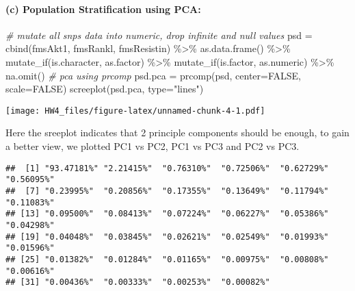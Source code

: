\documentclass[
]{article}
\newenvironment{Shaded}{\begin{snugshade}}{\end{snugshade}}
\newcommand{\AttributeTok}[1]{\textcolor[rgb]{0.77,0.63,0.00}{#1}}
\newcommand{\CommentTok}[1]{\textcolor[rgb]{0.56,0.35,0.01}{\textit{#1}}}
\newcommand{\ConstantTok}[1]{\textcolor[rgb]{0.00,0.00,0.00}{#1}}
\newcommand{\DecValTok}[1]{\textcolor[rgb]{0.00,0.00,0.81}{#1}}
\newcommand{\FunctionTok}[1]{\textcolor[rgb]{0.00,0.00,0.00}{#1}}
\newcommand{\NormalTok}[1]{#1}
\newcommand{\OtherTok}[1]{\textcolor[rgb]{0.56,0.35,0.01}{#1}}
\newcommand{\SpecialCharTok}[1]{\textcolor[rgb]{0.00,0.00,0.00}{#1}}
\newcommand{\StringTok}[1]{\textcolor[rgb]{0.31,0.60,0.02}{#1}}
\begin{document}
\hypertarget{c-population-stratification-using-pca}{%
\paragraph{(c) Population Stratification using
PCA:}\label{c-population-stratification-using-pca}}

\begin{Shaded}
\begin{Highlighting}[]
\CommentTok{\# mutate all snps data into numeric, drop infinite and null values}
\NormalTok{psd }\OtherTok{=} \FunctionTok{cbind}\NormalTok{(fmsAkt1, fmsRankl, fmsResistin) }\SpecialCharTok{\%\textgreater{}\%} 
  \FunctionTok{as.data.frame}\NormalTok{() }\SpecialCharTok{\%\textgreater{}\%} 
  \FunctionTok{mutate\_if}\NormalTok{(is.character, as.factor) }\SpecialCharTok{\%\textgreater{}\%} 
  \FunctionTok{mutate\_if}\NormalTok{(is.factor, as.numeric) }\SpecialCharTok{\%\textgreater{}\%} 
  \FunctionTok{na.omit}\NormalTok{()}
\CommentTok{\# pca using prcomp}
\NormalTok{psd.pca }\OtherTok{=} \FunctionTok{prcomp}\NormalTok{(psd, }\AttributeTok{center=}\ConstantTok{FALSE}\NormalTok{, }\AttributeTok{scale=}\ConstantTok{FALSE}\NormalTok{)}
\FunctionTok{screeplot}\NormalTok{(psd.pca, }\AttributeTok{type=}\StringTok{"lines"}\NormalTok{)}
\end{Highlighting}
\end{Shaded}

\texttt{[image: HW4\_files/figure-latex/unnamed-chunk-4-1.pdf]}

Here the sreeplot indicates that 2 principle components should be
enough, to gain a better view, we plotted PC1 vs PC2, PC1 vs PC3 and PC2
vs PC3.

\begin{Shaded}
\end{Shaded}

\begin{verbatim}
##  [1] "93.47181%" "2.21415%"  "0.76310%"  "0.72506%"  "0.62729%"  "0.56095%" 
##  [7] "0.23995%"  "0.20856%"  "0.17355%"  "0.13649%"  "0.11794%"  "0.11083%" 
## [13] "0.09500%"  "0.08413%"  "0.07224%"  "0.06227%"  "0.05386%"  "0.04298%" 
## [19] "0.04048%"  "0.03845%"  "0.02621%"  "0.02549%"  "0.01993%"  "0.01596%" 
## [25] "0.01382%"  "0.01284%"  "0.01165%"  "0.00975%"  "0.00808%"  "0.00616%" 
## [31] "0.00436%"  "0.00333%"  "0.00253%"  "0.00082%"
\end{verbatim}
\end{document}
